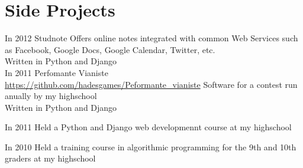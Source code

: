 \documentclass[]{friggeri-cv}
\begin{document}


% 

\pagebreak

\section{Side Projects}

\begin{entrylist}
  \entry
  {In 2012} 
  {}
  {Studnote}
  {}%
  {
    Offers online notes integrated with common Web Services such as Facebook, Google Docs, Google Calendar, Twitter, etc. \\
    Written in Python and Django \\ 
  }
  \entry
  {In 2011}
  {}
  {Perfomante Vianiste}
  {
    \href{https://github.com/hadesgames/Performante\_vianiste}{https://github.com/hadesgames/Peformante\_vianiste}
  }
  {
    Software for a contest run anually by my highschool \\
    Written in Python and Django \\
  }

  \entry
  {In 2011}
  {}
  {Held a Python and Django web developmennt course at my highschool}
  {}
  {}

  \entry
  {In 2010}
  {}
  {Held a training course in algorithmic programming for the 9th and 10th graders at my highschool}
  {}
  {}
\end{entrylist}
\end{document}
